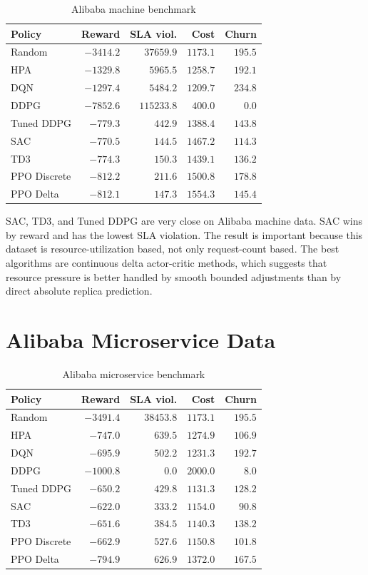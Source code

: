 \documentclass{rapportINPTCLOUD}
\newcommand{\best}[1]{\textbf{#1}}
\begin{document}
\begin{table}[H]
\centering
\small
\begin{tabular}{lrrrr}
\toprule
\textbf{Policy} & \textbf{Reward} & \textbf{SLA viol.} & \textbf{Cost} & \textbf{Churn} \\
\midrule
Random & $-3414.2$ & $37659.9$ & $1173.1$ & $195.5$ \\
HPA & $-1329.8$ & $5965.5$ & $1258.7$ & $192.1$ \\
DQN & $-1297.4$ & $5484.2$ & $1209.7$ & $234.8$ \\
DDPG & $-7852.6$ & $115233.8$ & $400.0$ & $0.0$ \\
Tuned DDPG & $-779.3$ & $442.9$ & $1388.4$ & $143.8$ \\
SAC & \best{$-770.5$} & $144.5$ & $1467.2$ & $114.3$ \\
TD3 & $-774.3$ & $150.3$ & $1439.1$ & $136.2$ \\
PPO Discrete & $-812.2$ & $211.6$ & $1500.8$ & $178.8$ \\
PPO Delta & $-812.1$ & $147.3$ & $1554.3$ & $145.4$ \\
\bottomrule
\end{tabular}
\caption{Alibaba machine benchmark}
\label{tab:alibaba-machine}
\end{table}

SAC, TD3, and Tuned DDPG are very close on Alibaba machine data. SAC wins by reward and has the lowest SLA violation. The result is important because this dataset is resource-utilization based, not only request-count based. The best algorithms are continuous delta actor-critic methods, which suggests that resource pressure is better handled by smooth bounded adjustments than by direct absolute replica prediction.

\section{Alibaba Microservice Data}

\begin{table}[H]
\centering
\small
\begin{tabular}{lrrrr}
\toprule
\textbf{Policy} & \textbf{Reward} & \textbf{SLA viol.} & \textbf{Cost} & \textbf{Churn} \\
\midrule
Random & $-3491.4$ & $38453.8$ & $1173.1$ & $195.5$ \\
HPA & $-747.0$ & $639.5$ & $1274.9$ & $106.9$ \\
DQN & $-695.9$ & $502.2$ & $1231.3$ & $192.7$ \\
DDPG & $-1000.8$ & $0.0$ & $2000.0$ & $8.0$ \\
Tuned DDPG & $-650.2$ & $429.8$ & $1131.3$ & $128.2$ \\
SAC & \best{$-622.0$} & $333.2$ & $1154.0$ & $90.8$ \\
TD3 & $-651.6$ & $384.5$ & $1140.3$ & $138.2$ \\
PPO Discrete & $-662.9$ & $527.6$ & $1150.8$ & $101.8$ \\
PPO Delta & $-794.9$ & $626.9$ & $1372.0$ & $167.5$ \\
\bottomrule
\end{tabular}
\caption{Alibaba microservice benchmark}
\label{tab:alibaba-micro}
\end{table}
\end{document}
